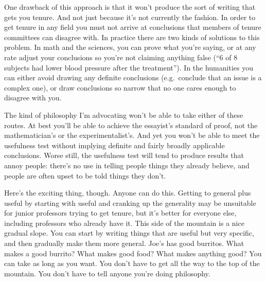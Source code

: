 \documentclass[12pt]{book}
\begin{document}
One drawback of this approach is that it won't produce the sort of
writing that gets you tenure. And not just because it's not currently
the fashion. In order to get tenure in any field you must not arrive at
conclusions that members of tenure committees can disagree with. In
practice there are two kinds of solutions to this problem. In math and
the sciences, you can prove what you're saying, or at any rate adjust
your conclusions so you're not claiming anything false (``6 of 8
subjects had lower blood pressure after the treatment''). In the
humanities you can either avoid drawing any definite conclusions
(e.g.~conclude that an issue is a complex one), or draw conclusions so
narrow that no one cares enough to disagree with you.

The kind of philosophy I'm advocating won't be able to take either of
these routes. At best you'll be able to achieve the essayist's standard
of proof, not the mathematician's or the experimentalist's. And yet you
won't be able to meet the usefulness test without implying definite and
fairly broadly applicable conclusions. Worse still, the usefulness test
will tend to produce results that annoy people: there's no use in
telling people things they already believe, and people are often upset
to be told things they don't.

Here's the exciting thing, though. Anyone can do this. Getting to
general plus useful by starting with useful and cranking up the
generality may be unsuitable for junior professors trying to get tenure,
but it's better for everyone else, including professors who already have
it. This side of the mountain is a nice gradual slope. You can start by
writing things that are useful but very specific, and then gradually
make them more general. Joe's has good burritos. What makes a good
burrito? What makes good food? What makes anything good? You can take as
long as you want. You don't have to get all the way to the top of the
mountain. You don't have to tell anyone you're doing philosophy.
\end{document}
